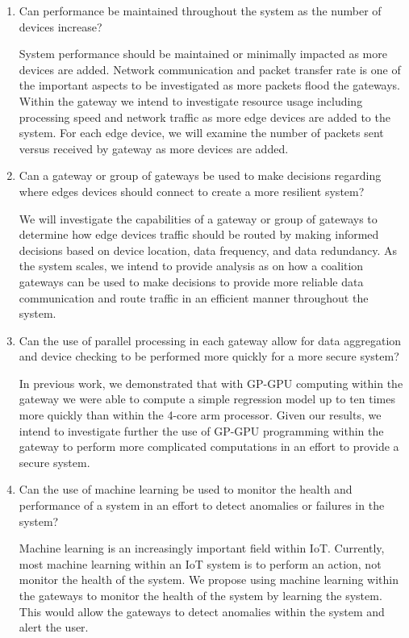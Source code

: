 \documentclass[../main.tex]{subfiles}
\begin{document}
\begin{enumerate}
    \item Can performance be maintained throughout the system as the number of devices increase?

System performance should be maintained or minimally impacted as more devices are added. Network communication and packet transfer rate is one of the important aspects to be investigated as more packets flood the gateways. Within the gateway we intend to investigate resource usage including processing speed and network traffic as more edge devices are added to the system. For each edge device, we will examine the number of packets sent versus received by gateway as more devices are added. 

    \item Can a gateway or group of gateways be used to make decisions regarding where edges devices should connect to create a more resilient system?
    
We will investigate the capabilities of a gateway or group of gateways to determine how edge devices traffic should be routed by making informed decisions based on device location, data frequency, and data redundancy. As the system scales, we intend to provide analysis as on how a coalition gateways can be used to make decisions to provide more reliable data communication and route traffic in an efficient manner throughout the system.

    

    \item Can the use of parallel processing in each gateway allow for data aggregation and device checking to be performed more quickly for a more secure system?
    
In previous work, we demonstrated that with GP-GPU computing within the gateway we were able to compute a simple regression model up to ten times more quickly than within the 4-core arm processor. Given our results, we intend to investigate further the use of GP-GPU programming within the gateway to perform more complicated computations in an effort to provide a secure system.     

    \item Can the use of machine learning be used to monitor the health and performance of a system in an effort to detect anomalies or failures in the system? 

Machine learning is an increasingly important field within IoT. Currently, most machine learning within an IoT system is to perform an action, not monitor the health of the system. We propose using machine learning within the gateways to monitor the health of the system by learning the system. This would allow the gateways to detect anomalies within the system and alert the user.   



\end{enumerate}
\end{document}
